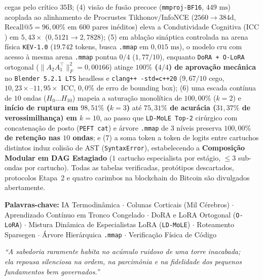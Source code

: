 \documentclass[10pt,a4paper]{article}
\begin{document}
{{cegas pelo cr\'itico $35\text{B}$; (4) vis\~ao de fus\~ao precoce (\texttt{mmproj-BF16}, $449\text{ ms}$) acoplada ao alinhamento de Procrustes Tikhonov/InfoNCE ($2560 \to 384\text{d}$, $\text{Recall@5}=96,00\%$ em $600$ pares inéditos) eleva a Condutividade Cognitiva ($\mathrm{ICC}$) em \textbf{$5,43\times$} ($0,5121 \to 2,7828$); (5) em abla\c{c}\~ao sin\'aptica controlada na arena f\'isica \texttt{KEV-1.0} ($19.742$ tokens, busca \texttt{.mmap} em $0,015\text{ ms}$), o modelo cru com acesso \`a mesma arena \texttt{.mmap} pontua $0/4$ ($1,77/10$), enquanto \texttt{DoRA + O-LoRA} ortogonal ($\|A_2 A_1^\top\|_F^2 = 0,00166$) atinge \textbf{$100\%$ ($4/4$) de aprova\c{c}\~ao mec\^anica} no \texttt{Blender 5.2.1 LTS} headless e \texttt{clang++ -std=c++20} ($9,67/10$ cego, $10,23\times\text{--}11,95\times$ $\mathrm{ICC}$, $0,0\%$ de erro de bounding box); (6) uma escada cont\'inua de $10$ ondas ($H_0\dots H_{10}$) mapeia a satura\c{c}\~ao monol\'itica de $100,00\%$ ($k=2$) e \textbf{in\'icio de ruptura em $98,51\%$ ($k=3$)} at\'e \textbf{$75,31\%$ de acur\'acia ($31,37\%$ de verossimilhan\c{c}a) em $k=10$}, ao passo que \texttt{LD-MoLE Top-2} cir\'urgico com concatena\c{c}\~ao de posto (\texttt{PEFT cat}) e \'arvore \texttt{.mmap} de 3 n\'iveis preserva \textbf{$100,00\%$ de reten\c{c}\~ao nas $10$ ondas}; e (7) a soma token a token de logits entre cartuchos distintos induz colis\~ao de AST (\texttt{SyntaxError}), estabelecendo a \textbf{Composi\c{c}\~ao Modular em DAG Estagiado} ($1$ cartucho especialista por est\'agio, $\le 3$ sub-ondas por cartucho). Todas as tabelas verificadas, prot\'otipos descartados, protocolos Etapa~2 e quatro carimbos na blockchain do Bitcoin s\~ao divulgados abertamente.\vspace{3pt}
  }%
}

\vspace{2pt}
{\footnotesize\textbf{\color{primary}Palavras-chave:} IA Termodin\^amica $\cdot$ Colunas Corticais (Mil C\'erebros) $\cdot$ Aprendizado Cont\'inuo em Tronco Congelado $\cdot$ DoRA e LoRA Ortogonal (\texttt{O-LoRA}) $\cdot$ Mistura Din\^amica de Especialistas LoRA (\texttt{LD-MoLE}) $\cdot$ Roteamento Sparsegen $\cdot$ \'Arvore Hier\'arquica \texttt{.mmap} $\cdot$ Verifica\c{c}\~ao F\'isica de C\'odigo}

\begin{flushright}
{\footnotesize\itshape\color{slate} ``A sabedoria raramente habita no ac\'umulo ruidoso de uma torre inacabada;\\ela repousa silenciosa na ordem, na parcim\^onia e na fidelidade dos pequenos fundamentos bem governados.''}
\end{flushright}
\end{document}

